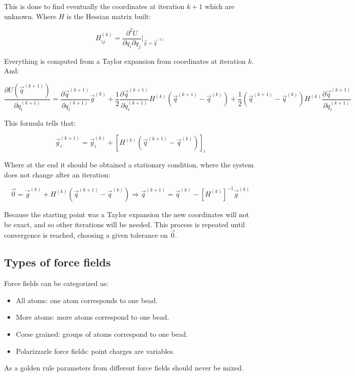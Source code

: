		This is done to find eventually the coordinates at iteration $k+1$ which are unknown.
		Where $H$ is the Hessian matrix built:

		$$H_{ij}^{(k)} = \frac{\partial^2 U}{\partial q_i\partial q_j}\biggr\vert_{\vec{q}=\vec{q}^{(k)}}$$

		Everything is computed from a Taylor expansion from coordinates at iteration $k$.
		And:

		$$\frac{\partial U(\vec{q}^{(k+1)})}{\partial q_i^{(k+1)}} = \frac{\partial \vec{q}^{(k+1)}}{\partial q_i^{(k+1)}}\vec{g}^{(k)}+ \frac{1}{2}\frac{\partial \vec{q}^{(k+1)}}{\partial q_i^{(k+1)}}H^{(k)}(\vec{q}^{(k+1)}-\vec{q}^{(k)})+\frac{1}{2}(\vec{q}^{(k+1)}-\vec{q}^{(k)})H^{(k)}\frac{\partial \vec{q}^{(k+1)}}{\partial q_i^{(k+1)}}$$

		This formula tells that:

		$$\vec{g}_i^{(k+1)} = \vec{g}_i^{(k)} + [H^{(k)}(\vec{q}^{(k+1)}-\vec{q}^{(k)})]_i$$

		Where at the end it should be obtained a stationary condition, where the system does not change after an iteration:

		$$\vec{0} = \vec{g}^{(k)} + H^{(k)}(\vec{q}^{(k+1)}-\vec{q}^{(k)})\Rightarrow \vec{q}^{(k+1)} = \vec{q}^{(k)} - [H^{(k)}]^{-1}\vec{g}^{(k)}$$

		Because the starting point was a Taylor expansion the new coordinates will not be exact, and so other iterations will be needed.
		This process is repeated until convergence is reached, choosing a given tolerance on $\vec{0}$.

	\subsection{Types of force fields}
	Force fields can be categorized as:

	\begin{multicols}{2}
		\begin{itemize}
			\item All atoms: one atom corresponds to one bead.
			\item More atoms: more atoms correspond to one bead.
			\item Corse grained: groups of atoms correspond to one bead.
			\item Polarizzarle force fields: point charges are variables.
		\end{itemize}
	\end{multicols}

	As a golden rule parameters from different force fields should never be mixed.
